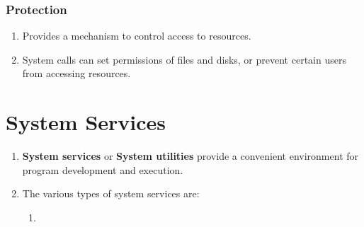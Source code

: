 \documentclass[journal,12pt,twocolumn]{IEEEtran}
\begin{document}
\subsubsection{Protection}
\begin{enumerate}
    \item Provides a mechanism to control access to resources.
    \item System calls can set permissions of files and disks, or
    prevent certain users from accessing resources.
\end{enumerate}

\section{System Services}
\begin{enumerate}
    \item \textbf{System services} or \textbf{System utilities} provide a 
    convenient environment for program development and execution.
    \item The various types of system services are:
    \begin{enumerate}
        \item 
    \end{enumerate}
\end{enumerate}
\end{document}
